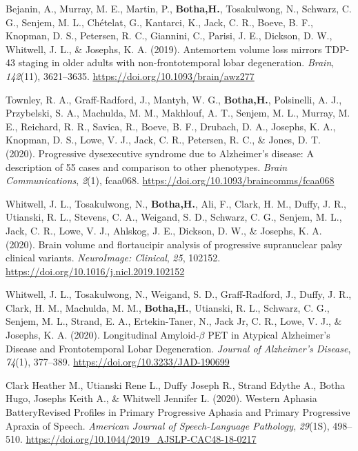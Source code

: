 \documentclass[11pt, a4paper]{awesome-cv}
\begin{document}
\leavevmode\hypertarget{ref-bejanin_antemortem_2019}{}%
Bejanin, A., Murray, M. E., Martin, P., \textbf{Botha,H.}, Tosakulwong,
N., Schwarz, C. G., Senjem, M. L., Chételat, G., Kantarci, K., Jack, C.
R., Boeve, B. F., Knopman, D. S., Petersen, R. C., Giannini, C., Parisi,
J. E., Dickson, D. W., Whitwell, J. L., \& Josephs, K. A. (2019).
Antemortem volume loss mirrors {TDP}-43 staging in older adults with
non-frontotemporal lobar degeneration. \emph{Brain}, \emph{142}(11),
3621--3635. \url{https://doi.org/10.1093/brain/awz277}

\leavevmode\hypertarget{ref-townley_progressive_2020}{}%
Townley, R. A., Graff-Radford, J., Mantyh, W. G., \textbf{Botha,H.},
Polsinelli, A. J., Przybelski, S. A., Machulda, M. M., Makhlouf, A. T.,
Senjem, M. L., Murray, M. E., Reichard, R. R., Savica, R., Boeve, B. F.,
Drubach, D. A., Josephs, K. A., Knopman, D. S., Lowe, V. J., Jack, C.
R., Petersen, R. C., \& Jones, D. T. (2020). Progressive dysexecutive
syndrome due to {Alzheimer}{'}s disease: A description of 55 cases and
comparison to other phenotypes. \emph{Brain Communications},
\emph{2}(1), fcaa068. \url{https://doi.org/10.1093/braincomms/fcaa068}

\leavevmode\hypertarget{ref-whitwell_brain_2020}{}%
Whitwell, J. L., Tosakulwong, N., \textbf{Botha,H.}, Ali, F., Clark, H.
M., Duffy, J. R., Utianski, R. L., Stevens, C. A., Weigand, S. D.,
Schwarz, C. G., Senjem, M. L., Jack, C. R., Lowe, V. J., Ahlskog, J. E.,
Dickson, D. W., \& Josephs, K. A. (2020). Brain volume and flortaucipir
analysis of progressive supranuclear palsy clinical variants.
\emph{NeuroImage: Clinical}, \emph{25}, 102152.
\url{https://doi.org/10.1016/j.nicl.2019.102152}

\leavevmode\hypertarget{ref-whitwell_longitudinal_2020}{}%
Whitwell, J. L., Tosakulwong, N., Weigand, S. D., Graff-Radford, J.,
Duffy, J. R., Clark, H. M., Machulda, M. M., \textbf{Botha,H.},
Utianski, R. L., Schwarz, C. G., Senjem, M. L., Strand, E. A.,
Ertekin-Taner, N., Jack Jr, C. R., Lowe, V. J., \& Josephs, K. A.
(2020). Longitudinal {Amyloid}-\(\beta\) {PET} in {Atypical}
{Alzheimer}{'}s {Disease} and {Frontotemporal} {Lobar} {Degeneration}.
\emph{Journal of Alzheimer's Disease}, \emph{74}(1), 377--389.
\url{https://doi.org/10.3233/JAD-190699}

\leavevmode\hypertarget{ref-clark_heather_m_western_2020}{}%
Clark Heather M., Utianski Rene L., Duffy Joseph R., Strand Edythe A.,
Botha Hugo, Josephs Keith A., \& Whitwell Jennifer L. (2020). Western
{Aphasia} {Battery}{{}}{Revised} {Profiles} in {Primary} {Progressive}
{Aphasia} and {Primary} {Progressive} {Apraxia} of {Speech}.
\emph{American Journal of Speech-Language Pathology}, \emph{29}(1S),
498--510. \url{https://doi.org/10.1044/2019_AJSLP-CAC48-18-0217}
\end{document}

